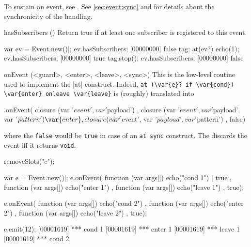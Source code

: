 \begin{urbiscriptapi}
To sustain an event, see .  See \autoref{sec:event:sync}
and  for details about the synchronicity of the handling.



\item[hasSubscribers]()%
  Return true if at least one subscriber is registered to this event.

\begin{urbiscript}
var ev = Event.new()|;
ev.hasSubscribers;
[00000000] false
tag: at(ev?) echo(1);
ev.hasSubscribers;
[00000000] true
tag.stop();
ev.hasSubscribers;
[00000000] false
\end{urbiscript}


\item[onEvent](<guard>, <enter>, <leave>, <sync>)%
  This is the low-level routine used to implement the \lstindex|at|
  construct.  Indeed,
  \lstinline|at (\var{e}? if \var{cond}) \var{enter} onleave \var{leave}|
  is (roughly) translated into
\begin{urbiunchecked}
  .onEvent(
    closure (var '$event', var '$payload')                 {   },
    closure (var '$event', var '$payload', var '$pattern') { \var{enter} },
    closure (var '$event', var '$payload', var '$pattern') {  },
    false)
\end{urbiunchecked}

\noindent
where the \lstinline|false| would be \lstinline|true| in case of an
\lstinline|at sync| construct.  The  discards the event iff it
returns \lstinline{void}.

\begin{urbicomment}
removeSlots("e");
\end{urbicomment}
\begin{urbiscript}
var e = Event.new()|;
e.onEvent(
  function (var args[]) { echo("cond 1") | true },
  function (var args[]) { echo("enter 1") },
  function (var args[]) { echo("leave 1") },
  true);

e.onEvent(
  function (var args[]) { echo("cond 2") },
  function (var args[]) { echo("enter 2") },
  function (var args[]) { echo("leave 2") },
  true);

e.emit(12);
[00001619] *** cond 1
[00001619] *** enter 1
[00001619] *** leave 1
[00001619] *** cond 2


\end{urbiscript}
\end{urbiscriptapi}
